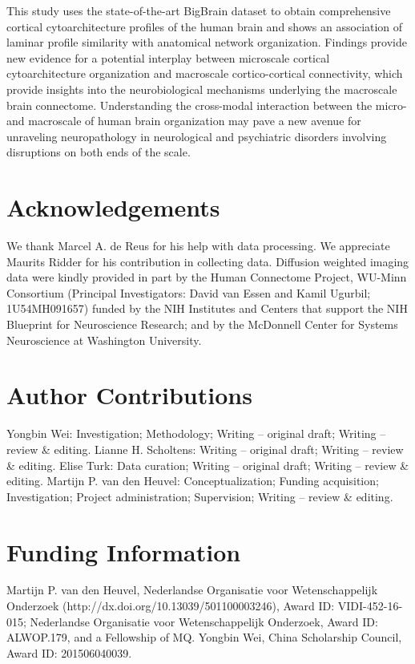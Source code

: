 \begin{refsection}
This study uses the state-of-the-art BigBrain dataset to obtain comprehensive cortical cytoarchitecture profiles of the human brain and shows an association of laminar profile similarity with anatomical network organization. Findings provide new evidence for a potential interplay between microscale cortical cytoarchitecture organization and macroscale cortico-cortical connectivity, which provide insights into the neurobiological mechanisms underlying the macroscale brain connectome. Understanding the cross-modal interaction between the micro- and macroscale of human brain organization may pave a new avenue for unraveling neuropathology in neurological and psychiatric disorders involving disruptions on both ends of the scale.

\section*{Acknowledgements}
We thank Marcel A. de Reus for his help with data processing. We appreciate Maurits Ridder for his contribution in collecting data. Diffusion weighted imaging data were kindly provided in part by the Human Connectome Project, WU-Minn Consortium (Principal Investigators: David van Essen and Kamil Ugurbil; 1U54MH091657) funded by the NIH Institutes and Centers that support the NIH Blueprint for Neuroscience Research; and by the McDonnell Center for Systems Neuroscience at Washington University.

\section*{Author Contributions}
Yongbin Wei: Investigation; Methodology; Writing – original draft; Writing – review \& editing. Lianne H. Scholtens: Writing – original draft; Writing – review \& editing. Elise Turk: Data curation; Writing – original draft; Writing – review \& editing. Martijn P. van den Heuvel: Conceptualization; Funding acquisition; Investigation; Project administration; Supervision; Writing – review \& editing.

\section*{Funding Information}
Martijn P. van den Heuvel, Nederlandse Organisatie voor Wetenschappelijk Onderzoek (http://dx.doi.org/10.13039/501100003246), Award ID: VIDI-452-16-015; Nederlandse Organisatie voor Wetenschappelijk Onderzoek, Award ID: ALWOP.179, and a Fellowship of MQ. Yongbin Wei, China Scholarship Council, Award ID: 201506040039.

\printbibliography[heading=subbibliography]

\end{refsection}

